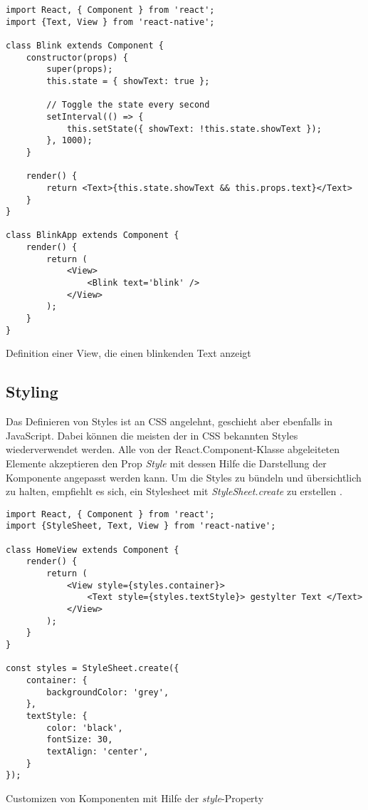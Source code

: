 \begin{listing}[H]
    \begin{verbatim}
import React, { Component } from 'react';
import {Text, View } from 'react-native';

class Blink extends Component {
    constructor(props) {
        super(props);
        this.state = { showText: true };
        
        // Toggle the state every second
        setInterval(() => {
            this.setState({ showText: !this.state.showText });
        }, 1000);
    }

    render() {
        return <Text>{this.state.showText && this.props.text}</Text>
    }
}

class BlinkApp extends Component {
    render() {
        return (
            <View>
                <Blink text='blink' />
            </View>
        );
    }
}

    \end{verbatim}
    \caption{Definition einer View, die einen blinkenden Text anzeigt \cite{facebook_inc._state_2017}}
    \label{lst:state}
\end{listing}


\subsection{Styling}
Das Definieren von Styles ist an CSS angelehnt, geschieht aber ebenfalls in JavaScript. Dabei können die meisten der in CSS bekannten Styles wiederverwendet werden. Alle von der React.Component-Klasse abgeleiteten Elemente akzeptieren den Prop \textit{Style} \cite{facebook_inc._style_2017} mit dessen Hilfe die Darstellung der Komponente angepasst werden kann. Um die Styles zu bündeln und übersichtlich zu halten, empfiehlt es sich, ein Stylesheet mit \textit{StyleSheet.create} zu erstellen \cite{facebook_inc._style_2017}. 

\begin{listing}[H]
    \begin{verbatim}
import React, { Component } from 'react';
import {StyleSheet, Text, View } from 'react-native';

class HomeView extends Component {
    render() {
        return (
            <View style={styles.container}>
                <Text style={styles.textStyle}> gestylter Text </Text>
            </View>
        );
    }
}

const styles = StyleSheet.create({
    container: {
        backgroundColor: 'grey',
    },
    textStyle: {
        color: 'black',
        fontSize: 30,
        textAlign: 'center',
    }
});    
    \end{verbatim}
    \caption{Customizen von Komponenten mit Hilfe der \textit{style}-Property}
    \label{lst:style}
\end{listing}

